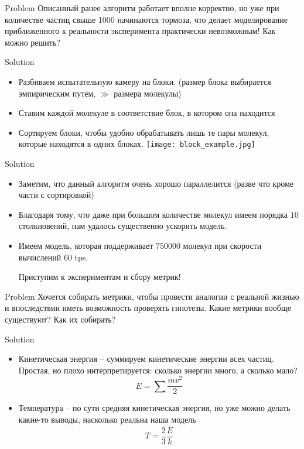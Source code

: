 \documentclass{beamer}
\begin{document}
\begin{frame}{Problem}
  Описанный ранее алгоритм работает вполне корректно, но уже при количестве частиц свыше 1000 начинаются тормоза, что делает моделирование приближенного к реальности эксперимента практически невозможным! Как можно решить? 
\end{frame}

\begin{frame}{Solution}
  \begin{itemize}
    \item<1-> Разбиваем испытательную камеру на блоки. (размер блока выбирается эмпирическим путём, $\gg$ размера молекулы)
    \item<2-> Ставим каждой молекуле в соответствие блок, в котором она находится
    \item<3-> Сортируем блоки, чтобы удобно обрабатывать лишь те пары молекул, которые находятся в одних блоках.
    \texttt{[image: block\_example.jpg]}
  \end{itemize}
\end{frame}

\begin{frame}{Solution}
  \begin{itemize}
    \item<1-> Заметим, что данный алгоритм очень хорошо параллелится (разве что кроме части с сортировкой)
    \item<2-> Благодаря тому, что даже при большом количестве молекул имеем порядка $10$ столкновений, нам удалось существенно ускорить модель.
    \item<3-> Имеем модель, которая поддерживает $750000$ молекул при скорости вычислений $60$ tps. 
    
    Приступим к экспериментам и сбору метрик!
  \end{itemize}
\end{frame}

\begin{frame}{Problem}
  Хочется собирать метрики, чтобы провести аналогии с реальной жизнью и впоследствии иметь возможность проверять гипотезы. Какие метрики вообще существуют? Как их собирать?
\end{frame}

\begin{frame}{Solution}
  \begin{itemize}
    \item<1-> Кинетическая энергия -- суммируем кинетические энергии всех частиц. Простая, но плохо интерпретируется: сколько энергии много, а сколько мало?
    \[
      E = \sum \frac{mv^2}{2}
    \]
    \item<2-> Температура -- по сути средняя кинетическая энергия, но уже можно делать какие-то выводы, насколько реальна наша модель
    \[
      T = \frac{2}{3}\frac{\overline{E}}{k}
    \]
  \end{itemize}
\end{frame}
\end{document}
